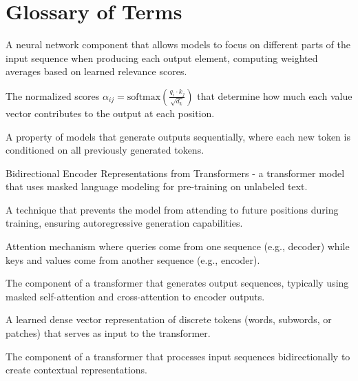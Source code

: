
\section{Glossary of Terms}

\begin{description}[leftmargin=!,labelwidth=\widthof{\bfseries Multi-Head Attention}]

\item[Attention Mechanism] A neural network component that allows models to focus on different parts of the input sequence when producing each output element, computing weighted averages based on learned relevance scores.

\item[Attention Weights] The normalized scores $\alpha_{ij} = \text{softmax}(\frac{q_i \cdot k_j}{\sqrt{d_k}})$ that determine how much each value vector contributes to the output at each position.

\item[Autoregressive] A property of models that generate outputs sequentially, where each new token is conditioned on all previously generated tokens.

\item[BERT] Bidirectional Encoder Representations from Transformers - a transformer model that uses masked language modeling for pre-training on unlabeled text.

\item[Causal Masking] A technique that prevents the model from attending to future positions during training, ensuring autoregressive generation capabilities.

\item[Cross-Attention] Attention mechanism where queries come from one sequence (e.g., decoder) while keys and values come from another sequence (e.g., encoder).

\item[Decoder] The component of a transformer that generates output sequences, typically using masked self-attention and cross-attention to encoder outputs.

\item[Embedding] A learned dense vector representation of discrete tokens (words, subwords, or patches) that serves as input to the transformer.

\item[Encoder] The component of a transformer that processes input sequences bidirectionally to create contextual representations.


\end{description}
